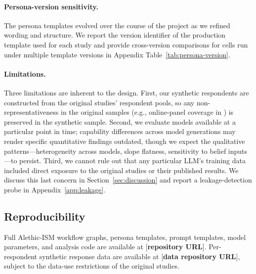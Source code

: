 \documentclass[12pt]{article}
\begin{document}
\paragraph{Persona-version sensitivity.} The persona templates evolved
over the course of the project as we refined wording and structure. We
report the version identifier of the production template used for each
study and provide cross-version comparisons for cells run under multiple
template versions in Appendix Table~\ref{tab:persona-version}.

\paragraph{Limitations.} Three limitations are inherent to the design.
First, our synthetic respondents are constructed from the original
studies' respondent pools, so any non-representativeness in the original
samples (e.g., online-panel coverage in \textcite{Giguere2020}) is
preserved in the synthetic sample. Second, we evaluate models available
at a particular point in time; capability differences across model
generations may render specific quantitative findings outdated, though
we expect the qualitative patterns---heterogeneity across models, slope
flatness, sensitivity to belief inputs---to persist. Third, we cannot
rule out that any particular LLM's training data included direct
exposure to the original studies or their published results. We discuss
this last concern in Section~\ref{sec:discussion} and report a
leakage-detection probe in Appendix~\ref{app:leakage}.

\subsection{Reproducibility}\label{sec:methods-reproducibility}

Full Alethic-ISM workflow graphs, persona templates, prompt templates,
model parameters, and analysis code are available at
[\textbf{repository URL}]. Per-respondent synthetic response data are
available at [\textbf{data repository URL}], subject to the data-use
restrictions of the original studies.

%
\end{document}

